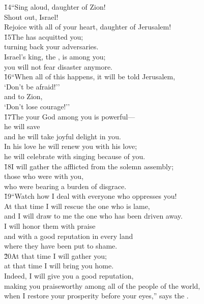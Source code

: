 \begin{poetry}
\poeml \v{14}``Sing aloud, daughter of Zion! \\
\poemll    Shout out, Israel! \\
\poemlll       Rejoice with all of your heart, daughter of Jerusalem! \\
\poeml \v{15}The  has acquitted you; \\
\poemll    turning back your adversaries. \\
\poeml Israel's king, the , is among you; \\
\poemll    you will not fear disaster anymore. \\
\poeml \v{16}``When all of this happens, it will be told Jerusalem, \\
\poemll    `Don't be afraid!'' \\
\poeml and to Zion, \\
\poemll    `Don't lose courage!'' \\
\poeml \v{17}The  your God among you is powerful--- \\
\poemll    he will save \\
\poeml and he will take joyful delight in you. \\
\poemll    In his love he will renew you with his love; \\
\poemlll       he will celebrate with singing because of you. \\
\poeml \v{18}I will gather the afflicted from the solemn assembly; \\
\poemll    those who were with you, \\
\poemlll       who were bearing a burden of disgrace. \\
\poeml \v{19}``Watch how I deal with everyone who oppresses you! \\
\poemll    At that time I will rescue the one who is lame, \\
\poemlll       and I will draw to me the one who has been driven away. \\
\poeml I will honor them with praise \\
\poemll    and with a good reputation in every land \\
\poemlll       where they have been put to shame. \\
\poeml \v{20}At that time I will gather you; \\
\poemll    at that time I will bring you home. \\
\poeml Indeed, I will give you a good reputation, \\
\poemll    making you praiseworthy among all of the people of the world, \\
\poemlll       when I restore your prosperity before your eyes,'' says the .\end{poetry}
